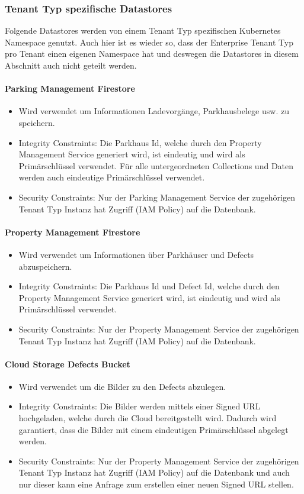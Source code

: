 \subsubsection{Tenant Typ spezifische Datastores}
Folgende Datastores werden von einem Tenant Typ spezifischen Kubernetes Namespace genutzt. Auch hier ist es wieder so, dass der Enterprise Tenant Typ pro Tenant einen eigenen Namespace hat und deswegen die Datastores in diesem Abschnitt auch nicht geteilt werden.

\paragraph{Parking Management Firestore}
\begin{itemize}
	\item Wird verwendet um Informationen Ladevorgänge, Parkhausbelege usw. zu speichern.
	\item Integrity Constraints: Die Parkhaus Id, welche durch den Property Management Service generiert wird, ist eindeutig und wird als Primärschlüssel verwendet. Für alle untergeordneten Collections und Daten werden auch eindeutige Primärschlüssel verwendet.
	\item Security Constraints: Nur der Parking Management Service der zugehörigen Tenant Typ Instanz hat Zugriff (IAM Policy) auf die Datenbank.
\end{itemize}

\paragraph{Property Management Firestore}
\begin{itemize}
	\item Wird verwendet um Informationen über Parkhäuser und Defects abzuspeichern.
	\item Integrity Constraints: Die Parkhaus Id und Defect Id, welche durch den Property Management Service generiert wird, ist eindeutig und wird als Primärschlüssel verwendet.
	\item Security Constraints: Nur der Property Management Service der zugehörigen Tenant Typ Instanz hat Zugriff (IAM Policy) auf die Datenbank.
\end{itemize}

\paragraph{Cloud Storage Defects Bucket}
\begin{itemize}
	\item Wird verwendet um die Bilder zu den Defects abzulegen.
	\item Integrity Constraints: Die Bilder werden mittels einer Signed URL hochgeladen, welche durch die Cloud bereitgestellt wird. Dadurch wird garantiert, dass die Bilder mit einem eindeutigen Primärschlüssel abgelegt werden.
	\item Security Constraints: Nur der Property Management Service der zugehörigen Tenant Typ Instanz hat Zugriff (IAM Policy) auf die Datenbank und auch nur dieser kann eine Anfrage zum erstellen einer neuen Signed URL stellen.
\end{itemize}

